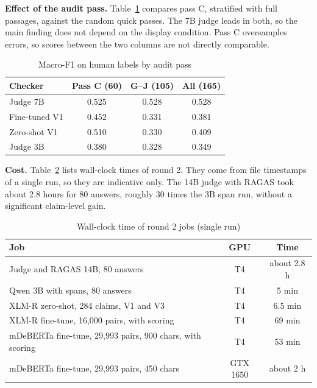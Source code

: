 \documentclass[conference]{IEEEtran}
\begin{document}
\textbf{Effect of the audit pass.} Table~\ref{tab:pass} compares pass C, stratified with full passages, against the random quick passes. The 7B judge leads in both, so the main finding does not depend on the display condition. Pass C oversamples errors, so scores between the two columns are not directly comparable.

\begin{table}[t]
\caption{Macro-F1 on human labels by audit pass}
\label{tab:pass}
\centering
\footnotesize
\begin{tabular}{lccc}
\toprule
Checker & Pass C (60) & G--J (105) & All (165) \\
\midrule
Judge 7B & 0.525 & 0.528 & 0.528 \\
Fine-tuned V1 & 0.452 & 0.331 & 0.381 \\
Zero-shot V1 & 0.510 & 0.330 & 0.409 \\
Judge 3B & 0.380 & 0.328 & 0.349 \\
\bottomrule
\end{tabular}
\end{table}

\textbf{Cost.} Table~\ref{tab:cost} lists wall-clock times of round 2. They come from file timestamps of a single run, so they are indicative only. The 14B judge with RAGAS took about 2.8 hours for 80 answers, roughly 30 times the 3B span run, without a significant claim-level gain.

\begin{table}[t]
\caption{Wall-clock time of round 2 jobs (single run)}
\label{tab:cost}
\centering
\footnotesize
\begin{tabular}{p{}cc}
\toprule
Job & GPU & Time \\
\midrule
Judge and RAGAS 14B, 80 answers & T4 & about 2.8 h \\
Qwen 3B with spans, 80 answers & T4 & 5 min \\
XLM-R zero-shot, 284 claims, V1 and V3 & T4 & 6.5 min \\
XLM-R fine-tune, 16,000 pairs, with scoring & T4 & 69 min \\
mDeBERTa fine-tune, 29,993 pairs, 900 chars, with scoring & T4 & 53 min \\
mDeBERTa fine-tune, 29,993 pairs, 450 chars & GTX 1650 & about 2 h \\
\bottomrule
\end{tabular}
\end{table}
\end{document}
